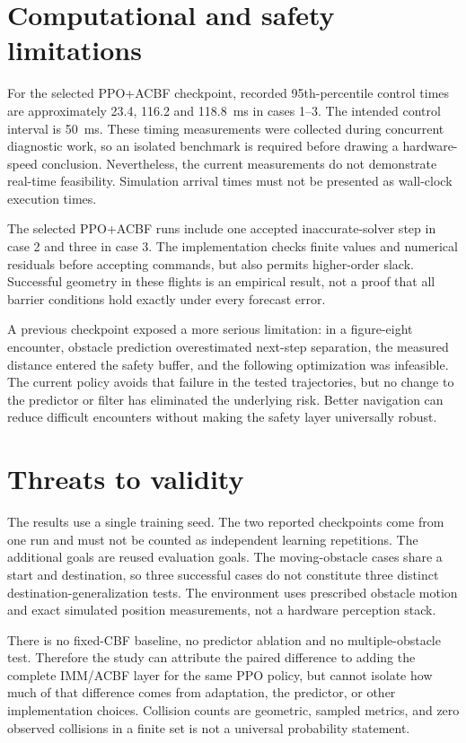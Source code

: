 \section{Computational and safety limitations}
For the selected PPO+ACBF checkpoint, recorded 95th-percentile control times are approximately 23.4, 116.2 and 118.8~ms in cases 1--3. The intended control interval is 50~ms. These timing measurements were collected during concurrent diagnostic work, so an isolated benchmark is required before drawing a hardware-speed conclusion. Nevertheless, the current measurements do not demonstrate real-time feasibility. Simulation arrival times must not be presented as wall-clock execution times.

The selected PPO+ACBF runs include one accepted inaccurate-solver step in case 2 and three in case 3. The implementation checks finite values and numerical residuals before accepting commands, but also permits higher-order slack. Successful geometry in these flights is an empirical result, not a proof that all barrier conditions hold exactly under every forecast error.

A previous checkpoint exposed a more serious limitation: in a figure-eight encounter, obstacle prediction overestimated next-step separation, the measured distance entered the safety buffer, and the following optimization was infeasible. The current policy avoids that failure in the tested trajectories, but no change to the predictor or filter has eliminated the underlying risk. Better navigation can reduce difficult encounters without making the safety layer universally robust.

\section{Threats to validity}
The results use a single training seed. The two reported checkpoints come from one run and must not be counted as independent learning repetitions. The additional goals are reused evaluation goals. The moving-obstacle cases share a start and destination, so three successful cases do not constitute three distinct destination-generalization tests. The environment uses prescribed obstacle motion and exact simulated position measurements, not a hardware perception stack.

There is no fixed-CBF baseline, no predictor ablation and no multiple-obstacle test. Therefore the study can attribute the paired difference to adding the complete IMM/ACBF layer for the same PPO policy, but cannot isolate how much of that difference comes from adaptation, the predictor, or other implementation choices. Collision counts are geometric, sampled metrics, and zero observed collisions in a finite set is not a universal probability statement.

